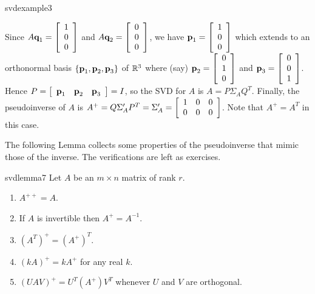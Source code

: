 \begin{example}{}{svdexample3}
\begin{solution}
Since $A\textbf{q}_{1}=
\left[ 
\begin{array}{c}
1 \\ 
0 \\ 
0
\end{array}
\right]$ and $A\textbf{q}_{2}=
\left[ 
\begin{array}{c}
0 \\ 
0 \\ 
0
\end{array}
\right]$, we have $\textbf{p}_{1}=
\left[ 
\begin{array}{c}
1 \\ 
0 \\ 
0
\end{array}
\right]$ which extends to an orthonormal basis $\{\textbf{p}_{1},\textbf{p}_{2},\textbf{p}_{3}\}$ of $\mathbb{R}^{3}$ where (say) $\textbf{p}_{2}=
\left[ 
\begin{array}{c}
0 \\ 
1 \\ 
0
\end{array}
\right]$ and $\textbf{p}_{3}=
\left[ 
\begin{array}{c}
0 \\ 
0 \\ 
1
\end{array}
\right]$. Hence $P=\left[ \begin{array}{ccc} \textbf{p}_{1}&\textbf{p}_{2}&\textbf{p}_{3}\end{array}\right]=I$, so
the SVD for $A$ is $A=P\Sigma _{A}Q^{T}.$ Finally, the pseudoinverse of $A$
is $A^{+}=Q\Sigma^{\prime}_{A}P^{T}=\Sigma^{\prime}_{A}=
\left[ 
\begin{array}{ccc}
1 & 0 & 0 \\ 
0 & 0 & 0
\end{array}
\right]$. Note that $A^{+}=A^{T}$ in this case.
\end{solution}
\end{example}

The following Lemma collects some properties of the pseudoinverse that mimic
those of the inverse. The verifications are left as exercises.

\begin{lemma}{}{svdlemma7} 
Let $A$ be an $m\times n$ matrix of rank $r$.

\begin{enumerate}
\item $A^{++}=A$.

\item If $A$ is invertible then $A^{+}=A^{-1}$.

\item $(A^{T})^{+}=(A^{+})^{T}$.

\item $(kA)^{+}=kA^{+}$ for any real $k$.

\item $(UAV)^{+}=U^{T}(A^{+})V^{T}$ whenever $U$ and $V$ are orthogonal.
\end{enumerate}
\end{lemma}

